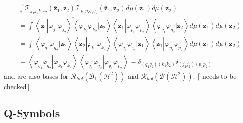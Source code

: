 \documentclass[aps,preprint]{revtex4}%
\begin{document}
\begin{align}
&  \int\overline{\mathcal{T}_{j_{1}j_{2}k_{1}k_{2}}\left(  \mathbf{\bar{z}%
}_{1},\mathbf{z}_{2}\right)  }\mathcal{T}_{p_{1}p_{2}q_{1}q_{2}}\left(
\mathbf{\bar{z}}_{1},\mathbf{z}_{2}\right)  d\mu\left(  \mathbf{z}_{1}\right)
d\mu\left(  \mathbf{z}_{2}\right)  \nonumber\\
&  =\int\overline{\left\langle \mathbf{z}_{1}\left\vert \varphi_{j_{1}}%
\varphi_{j_{2}}\right.  \right\rangle \left\langle \varphi_{k_{1}}%
\varphi_{k_{2}}\left\vert \mathbf{z}_{2}\right.  \right\rangle }\left\langle
\mathbf{z}_{1}\left\vert \varphi_{p_{1}}\varphi_{p_{2}}\right.  \right\rangle
\left\langle \varphi_{q_{1}}\varphi_{q_{2}}\left\vert \mathbf{z}_{2}\right.
\right\rangle d\mu\left(  \mathbf{z}_{1}\right)  d\mu\left(  \mathbf{z}%
_{2}\right)  \nonumber\\
&  =\int\left\langle \varphi_{q_{1}}\varphi_{q_{2}}\left\vert \mathbf{z}%
_{2}\right.  \right\rangle \left\langle \mathbf{z}_{2}\left\vert
\varphi_{k_{1}}\varphi_{k_{2}}\right.  \right\rangle \left\langle
\varphi_{j_{1}}\varphi_{j_{2}}\left\vert \mathbf{z}_{1}\right.  \right\rangle
\left\langle \mathbf{z}_{1}\left\vert \varphi_{p_{1}}\varphi_{p_{2}}\right.
\right\rangle d\mu\left(  \mathbf{z}_{1}\right)  d\mu\left(  \mathbf{z}%
_{2}\right)  \nonumber\\
&  =\left\langle \varphi_{q_{1}}\varphi_{q_{2}}\left\vert \varphi_{k_{1}%
}\varphi_{k_{2}}\right.  \right\rangle \left\langle \varphi_{j_{1}}%
\varphi_{j_{2}}\left\vert \varphi_{p_{1}}\varphi_{p_{2}}\right.  \right\rangle
=\delta_{\left(  q_{1}q_{2}\right)  \left(  k_{1}k_{2}\right)  }%
\delta_{\left(  j_{1}j_{2}\right)  \left(  p_{1}p_{2}\right)  }%
\end{align}
and are also bases for $\mathcal{R}_{hol}\left(  \mathcal{B}_{1}\left(
\mathcal{H}^{2}\right)  \right)  $ and $\mathcal{R}_{hol}\left(
\mathcal{B}\left(  \mathcal{H}^{2}\right)  \right)  .$ $\lceil$ needs to be
checked$\rfloor$

\subsection{Q-Symbols}
\end{document}
